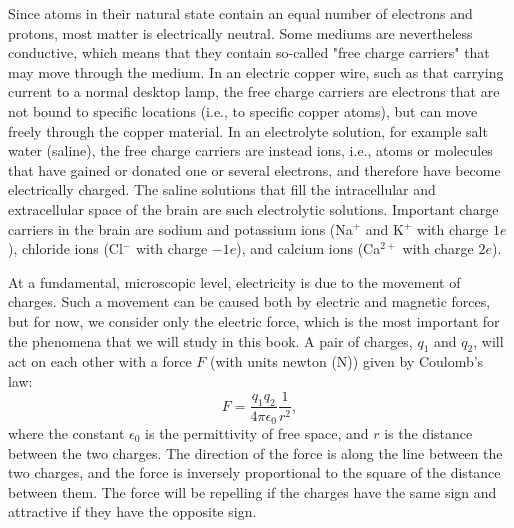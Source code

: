 Since atoms in their natural state contain an equal number of electrons and protons, most matter is electrically neutral. Some mediums are nevertheless conductive, which means that they contain so-called "free charge carriers" that may move through the medium. In an electric copper wire, such as that carrying current to a normal desktop lamp, the free charge carriers are electrons that are not bound to specific locations (i.e., to specific copper atoms), but can move freely through the copper material. In an electrolyte solution, for example salt water  (saline), the free charge carriers are instead ions, i.e., atoms or molecules that have gained or donated one or several electrons, and therefore have become electrically charged. The saline solutions that fill the intracellular and extracellular space of the brain are such electrolytic solutions. Important charge carriers in the brain are sodium and potassium ions (Na$^+$ and K$^+$ with charge $1e$), chloride ions (Cl$^-$ with charge $-1e$), and calcium ions (Ca$^{2+}$ with charge $2e$).

At a fundamental, microscopic level, electricity is due to the movement of charges. Such a movement can be caused both by electric and magnetic forces, but for now, we consider only the electric force, which is the most important for the phenomena that we will study in this book. A pair of charges, $q_1$ and $q_2$, will act on each other with a force $F$ (with units newton (\si{\newton})) given by Coulomb's law:
\begin{equation}
F = \frac{q_1q_2}{4\pi \epsilon_0} \frac{1}{r^2},
\label{eq:Basics:CoulombF}
\end{equation}
where the constant $\epsilon_0$ is the permittivity of free space, and $r$ is the distance between the two charges. The direction of the force is along the line between the two charges, and the force is inversely proportional to the square of the distance between them. The force will be repelling if the charges have the same sign and attractive if they have the opposite sign. 

